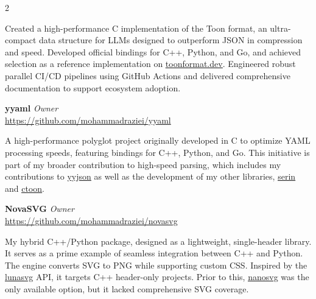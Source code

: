 \documentclass[a4paper,11pt]{article}
\begin{document}
\begin{multicols}{2}
\begin{minipage}{\linewidth}
	\vspace{4pt} \small
	Created a high-performance C implementation of the Toon format, an ultra-compact data structure for LLMs designed to outperform JSON in compression and speed. Developed official bindings for C++, Python, and Go, and achieved selection as a reference implementation on \href{https://toonformat.dev/ecosystem/implementations.html}{\uline{toonformat.dev}}. Engineered robust parallel CI/CD pipelines using GitHub Actions and delivered comprehensive documentation to support ecosystem adoption.
\end{minipage}


	\item \begin{minipage}{\linewidth}
		\faCode\hspace{3pt}\textbf{yyaml} 
		\hfill \textit{Owner} \\ 
		\url{https://github.com/mohammadraziei/yyaml}
		
		\vspace{4pt} \small
           A high-performance polyglot project originally developed in C to optimize YAML processing speeds, featuring bindings for C++, Python, and Go. This initiative is part of my broader contribution to high-speed parsing, which includes my contributions to \href{https://github.com/ibireme/yyjson}{\uline{yyjson}} as well as the development of my other libraries, \href{https://github.com/mohammadraziei/serin}{\uline{serin}} and \href{https://github.com/mohammadraziei/ctoon}{\uline{ctoon}}.
	\end{minipage}
	
	\item \begin{minipage}{\linewidth}
		\faCode\hspace{3pt}\textbf{NovaSVG} 
		\hfill \textit{Owner} \\ 
		\url{https://github.com/mohammadraziei/novasvg}
		
		\vspace{4pt} \small
        My hybrid C++/Python package, designed as a lightweight, single-header library. It serves as a prime example of seamless integration between C++ and Python. The engine converts SVG to PNG while supporting custom CSS. Inspired by the \href{https://github.com/sammycage/lunasvg}{\uline{lunasvg}} API, it targets C++ header-only projects. Prior to this, \href{https://github.com/mattiasgustavsson/libs}{\uline{nanosvg}} was the only available option, but it lacked comprehensive SVG coverage.		
	\end{minipage}
	

\end{multicols}
\end{document}
